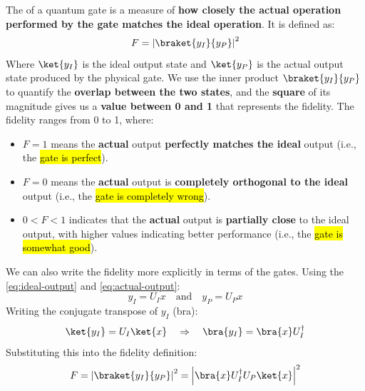 \highspace
\begin{definitionbox}[: Fidelity]
    The  of a quantum gate is a measure of \textbf{how closely the actual operation performed by the gate matches the ideal operation}. It is defined as:
    \begin{equation}\label{eq:fidelity}
        F = \left| \braket{y_I}{y_P} \right|^2
    \end{equation}
    Where $\ket{y_I}$ is the ideal output state and $\ket{y_P}$ is the actual output state produced by the physical gate. We use the inner product $\braket{y_I}{y_P}$ to quantify the \textbf{overlap between the two states}, and the \textbf{square} of its magnitude gives us a \textbf{value between 0 and 1} that represents the fidelity.
    The fidelity ranges from 0 to 1, where:
    \begin{itemize}
        \item $F = 1$ means the \textbf{actual} output \textbf{perfectly matches the ideal} output (i.e., the \hl{gate is perfect}).
        \item $F = 0$ means the \textbf{actual} output is \textbf{completely orthogonal to the ideal} output (i.e., the \hl{gate is completely wrong}).
        \item $0 < F < 1$ indicates that the \textbf{actual} output is \textbf{partially close} to the ideal output, with higher values indicating better performance (i.e., the \hl{gate is somewhat good}).
    \end{itemize}

    We can also write the fidelity more explicitly in terms of the gates. Using the \autoref{eq:ideal-output} and \autoref{eq:actual-output}:
    \begin{equation*}
        y_I = U_I x \quad \text{and} \quad y_P = U_P x
    \end{equation*}
    Writing the conjugate transpose of $y_I$ (bra):
    \begin{equation*}
        \ket{y_I} = U_I \ket{x} \quad \Rightarrow \quad \bra{y_I} = \bra{x} U_I^\dagger
    \end{equation*}
    Substituting this into the fidelity definition:
    \begin{equation}\label{eq:fidelity-explicit}
        F = \left| \braket{y_I}{y_P} \right|^2 = \left| \bra{x} U_I^\dagger U_P \ket{x} \right|^2
    \end{equation}
\end{definitionbox}

